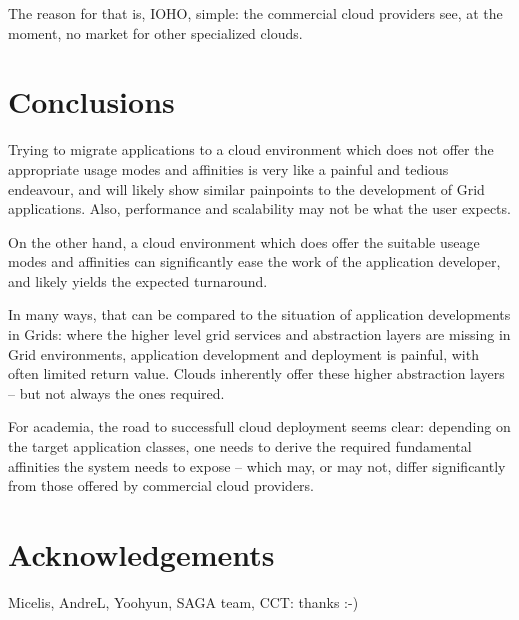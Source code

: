 \documentclass{article}
\begin{document}
  The reason for that is, IOHO, simple: the commercial cloud
  providers see, at the moment, no market for other specialized
  clouds.  




  
  
 


\section{Conclusions}
\label{sec:conclusion}

  Trying to migrate applications to a cloud environment which
  does not offer the appropriate usage modes and affinities is
  very like a painful and tedious endeavour, and will likely
  show similar painpoints to the development of Grid
  applications.  Also, performance and scalability may not be
  what the user expects.

  On the other hand, a cloud environment which does offer the
  suitable useage modes and affinities can significantly ease
  the work of the application developer, and likely yields the
  expected turnaround.

  In many ways, that can be compared to the situation of
  application developments in Grids: where the higher level grid
  services and abstraction layers are missing in Grid
  environments, application development and deployment is
  painful, with often limited return value.  Clouds inherently
  offer these higher abstraction layers -- but not always the
  ones required.

  For academia, the road to successfull cloud deployment seems
  clear: depending on the target application classes, one needs
  to derive the required fundamental affinities the system needs
  to expose -- which may, or may not, differ significantly from
  those offered by commercial cloud providers.

\section{Acknowledgements}
\label{sec:acks}

Micelis, AndreL, Yoohyun, SAGA team, CCT: thanks :-)



\end{document}
